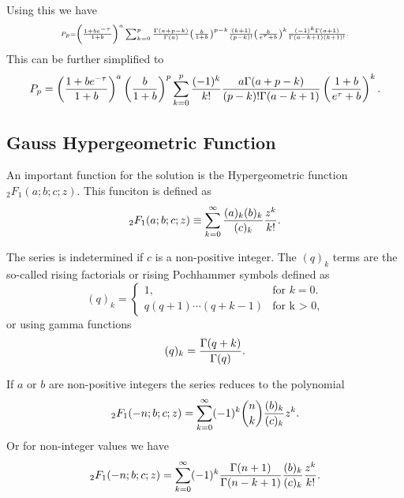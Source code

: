 Using this we have
\begin{equation}
  \scriptscriptstyle
  P_p = \left( {1 + b e^{-\tau} \over 1 + b} \right)^a
  \sum_{k=0}^p {\Gamma (a + p - k) \over \Gamma(a)}
  \left( {b \over 1 + b} \right)^{p - k}
  {(k + 1) \over (p - k)!} \left( b \over e^\tau + b \right)^k
  {(-1)^k \Gamma(a + 1) \over \Gamma(a - k + 1) (k + 1)!}.
\end{equation}
This can be further simplified to
\begin{equation}
  P_p = \left( {1 + b e^{-\tau} \over 1 + b} \right)^a
  \left( {b \over 1 + b} \right)^p
  \sum_{k=0}^p {(-1)^k \over k!}
  {a \Gamma(a + p - k) \over (p - k)! \Gamma(a - k + 1)}
  \left( {1 + b \over e^\tau + b} \right)^k.
  \label{eq_dist_nohyper}
\end{equation}

\subsection{Gauss Hypergeometric Function}

An important function for the solution is the Hypergeometric function
$_2F_1(a; b; c; z)$. This funciton is defined as
\begin{equation}
  _2F_1(a; b; c; z) \equiv \sum_{k=0}^\infty
  {(a)_k (b)_k \over (c)_k} {z^k \over k!}.
\end{equation}

The series is indetermined if $c$ is a non-positive integer. The $(q)_k$ terms
are the so-called rising factorials or rising Pochhammer symbols defined as
\begin{equation}
  (q)_k = \begin{cases}
  1, & \text{for }k = 0.\\
  q (q + 1)\cdots (q + k - 1) & \text{for k > 0},
  \end{cases}
\end{equation}
or using gamma functions
\begin{equation}
  (q)_k = {\Gamma (q + k) \over \Gamma (q)}.
\end{equation}

If $a$ or $b$ are non-positive integers the series reduces to the polynomial
\begin{equation}
_2F_1(-n; b; c; z) = \sum_{k=0}^\infty (-1)^k {n \choose k}
                    {(b)_k \over (c)_k} z^k.
\end{equation}
Or for non-integer values we have
\begin{equation}
_2F_1(-n; b; c; z) = \sum_{k=0}^\infty (-1)^k
                    {\Gamma (n + 1) \over \Gamma (n - k + 1)}
                    {(b)_k \over (c)_k} {z^k \over k!}.
\end{equation}

